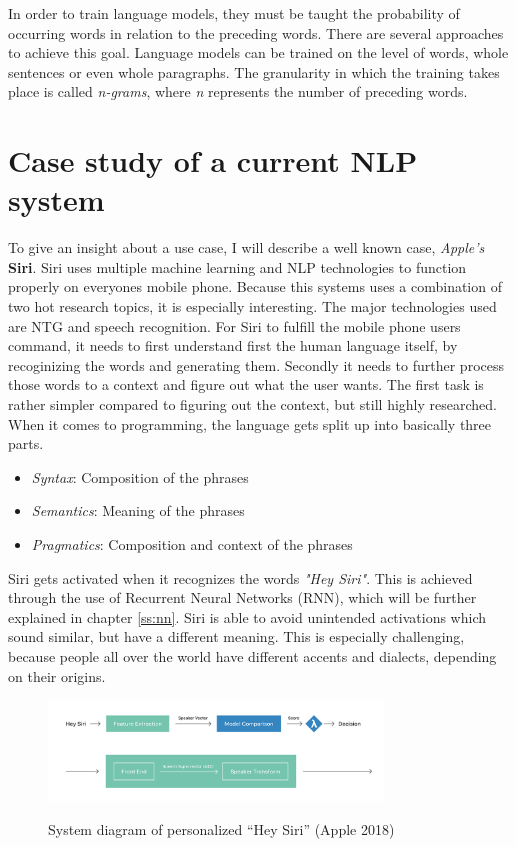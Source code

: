 In order to train language models, they must be taught the probability of occurring words in relation to the preceding words. There are several approaches to achieve this goal. Language models can be trained on the level of words, whole sentences or even whole paragraphs. The granularity in which the training takes place is called \textit{n-grams}, where \textit{n} represents the number of preceding words.

\section{Case study of a current NLP system}
To give an insight about a use case, I will describe a well known case, \textit{Apple's} \textbf{Siri}. Siri uses multiple machine learning and NLP technologies to function properly on everyones mobile phone. Because this systems uses a combination of two hot research topics, it is especially interesting. The major technologies used are NTG and speech recognition. For Siri to fulfill the mobile phone users command, it needs to first understand first the human language itself, by recoginizing the words and generating them. Secondly it needs to further process those words to a context and figure out what the user wants. 
The first task is rather simpler compared to figuring out the context, but still highly researched. When it comes to programming, the language gets split up into basically three parts.

\begin{itemize}
\item \textit{Syntax}: Composition of the phrases
\item \textit{Semantics}: Meaning of the phrases
\item \textit{Pragmatics}: Composition and context of the phrases
\end{itemize}

Siri gets activated when it recognizes the words \textit{"Hey Siri"}. This is achieved through the use of Recurrent Neural Networks (RNN), which will be further explained in chapter \ref{ss:nn}. Siri is able to avoid unintended activations which sound similar, but have a different meaning. This is especially challenging, because people all over the world have different accents and dialects, depending on their origins. 
	
	
\begin{figure}
  \begin{center}
  \includegraphics[width=3.5in]{photos/siri1}\\
  \caption{System diagram of personalized “Hey Siri” (Apple 2018)}\label{siri1}
  \end{center}
\end{figure}



